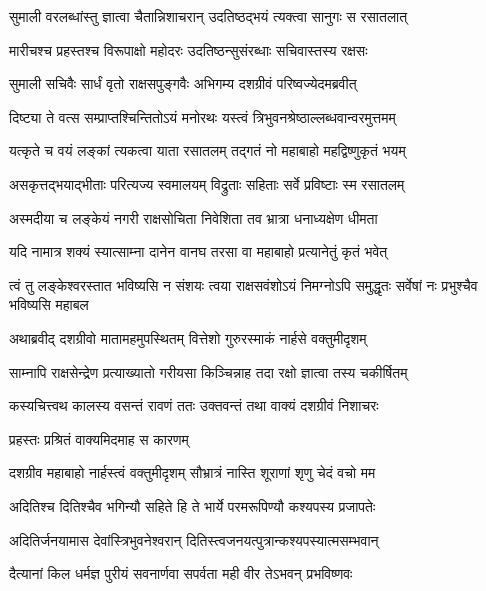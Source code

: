 
\twolineshloka
{सुमाली वरलब्धांस्तु ज्ञात्वा चैतान्निशाचरान्}
{उदतिष्ठद्भयं त्यक्त्वा सानुगः स रसातलात्} %

\twolineshloka
{मारीचश्च प्रहस्तश्च विरूपाक्षो महोदरः}
{उदतिष्ठन्सुसंरब्धाः सचिवास्तस्य रक्षसः} %

\twolineshloka
{सुमाली सचिवैः सार्धं वृतो राक्षसपुङ्गवैः}
{अभिगम्य दशग्रीवं परिष्वज्येदमब्रवीत्} %

\twolineshloka
{दिष्ट्या ते वत्स सम्प्राप्तश्चिन्तितोऽयं मनोरथः}
{यस्त्वं त्रिभुवनश्रेष्ठाल्लब्धवान्वरमुत्तमम्} %

\twolineshloka
{यत्कृते च वयं लङ्कां त्यकत्वा याता रसातलम्}
{तद्गतं नो महाबाहो महद्विष्णुकृतं भयम्} %

\twolineshloka
{असकृत्तद्भयाद्भीताः परित्यज्य स्वमालयम्}
{विद्रुताः सहिताः सर्वे प्रविष्टाः स्म रसातलम्} %

\twolineshloka
{अस्मदीया च लङ्केयं नगरी राक्षसोचिता}
{निवेशिता तव भ्रात्रा धनाध्यक्षेण धीमता} %

\twolineshloka
{यदि नामात्र शक्यं स्यात्साम्ना दानेन वानघ}
{तरसा वा महाबाहो प्रत्यानेतुं कृतं भवेत्} %

\threelineshloka
{त्वं तु लङ्केश्वरस्तात भविष्यसि न संशयः}
{त्वया राक्षसवंशोऽयं निमग्नोऽपि समुद्धृतः}
{सर्वेषां नः प्रभुश्चैव भविष्यसि महाबल} %

\twolineshloka
{अथाब्रवीद् दशग्रीवो मातामहमुपस्थितम्}
{वित्तेशो गुरुरस्माकं नार्हसे वक्तुमीदृशम्} %

\twolineshloka
{साम्नापि राक्षसेन्द्रेण प्रत्याख्यातो गरीयसा}
{किञ्चिन्नाह तदा रक्षो ज्ञात्वा तस्य चकीर्षितम्} %

\twolineshloka
{कस्यचित्त्वथ कालस्य वसन्तं रावणं ततः}
{उक्तवन्तं तथा वाक्यं दशग्रीवं निशाचरः} %

\onelineshloka
{प्रहस्तः प्रश्रितं वाक्यमिदमाह स कारणम्} %

\twolineshloka
{दशग्रीव महाबाहो नार्हस्त्वं वक्तुमीदृशम्}
{सौभ्रात्रं नास्ति शूराणां शृणु चेदं वचो मम} %

\twolineshloka
{अदितिश्च दितिश्चैव भगिन्यौ सहिते हि ते}
{भार्ये परमरूपिण्यौ कश्यपस्य प्रजापतेः} %

\twolineshloka
{अदितिर्जनयामास देवांस्त्रिभुवनेश्वरान्}
{दितिस्त्वजनयत्पुत्रान्कश्यपस्यात्मसम्भवान्} %

\twolineshloka
{दैत्यानां किल धर्मज्ञ पुरीयं सवनार्णवा}
{सपर्वता मही वीर तेऽभवन् प्रभविष्णवः} %

